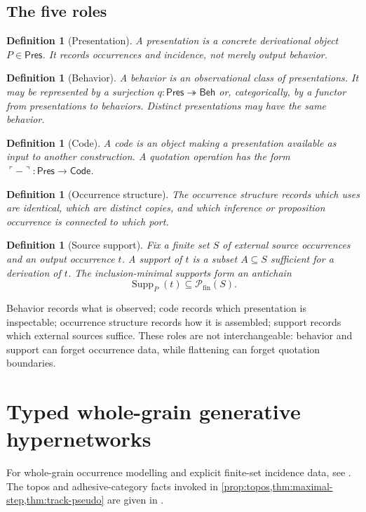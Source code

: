 \documentclass[12pt,a4paper,twoside]{extarticle}
\theoremstyle{compactplain}
\theoremstyle{compactdef}
\newtheorem{definition}[theorem]{Definition}
\newcommand{\Pres}{\mathsf{Pres}}
\newcommand{\Beh}{\mathsf{Beh}}
\newcommand{\onto}{\twoheadrightarrow}
\begin{document}
\subsection{The five roles}
\begin{definition}[Presentation]
A presentation is a concrete derivational object $P\in\Pres$. It records occurrences and incidence, not merely output behavior.
\end{definition}
\begin{definition}[Behavior]
A behavior is an observational class of presentations. It may be represented by a surjection $q:\Pres\onto\Beh$ or, categorically, by a functor from presentations to behaviors. Distinct presentations may have the same behavior.
\end{definition}
\begin{definition}[Code]
A code is an object making a presentation available as input to another construction. A quotation operation has the form $\ulcorner-\urcorner:\Pres\to\mathsf{Code}$.
\end{definition}
\begin{definition}[Occurrence structure]
The occurrence structure records which uses are identical, which are distinct copies, and which inference or proposition occurrence is connected to which port.
\end{definition}
\begin{definition}[Source support]
Fix a finite set $S$ of external source occurrences and an output occurrence $t$. A support of $t$ is a subset $A\subseteq S$ sufficient for a derivation of $t$. The inclusion-minimal supports form an antichain
\[
\operatorname{Supp}_P(t)\subseteq\mathcal P_{\mathrm{fin}}(S).
\]
\end{definition}
Behavior records what is observed; code records which presentation is inspectable; occurrence structure records how it is assembled; support records which external sources suffice.  These roles are not interchangeable: behavior and support can forget occurrence data, while flattening can forget quotation boundaries.
\section{Typed whole-grain generative hypernetworks}
For whole-grain occurrence modelling and explicit finite-set incidence data, see \cite{kock-petri}.  The topos and adhesive-category facts invoked in \cref{prop:topos,thm:maximal-step,thm:track-pseudo} are given in \cite{maclane-moerdijk,lack-sobocinski}.
\end{document}
